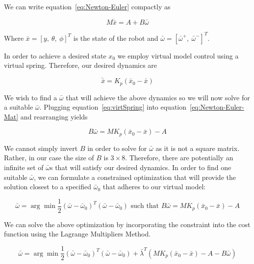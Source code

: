 \documentclass{article}
\begin{document}
We can write equation~\ref{eq:Newton-Euler} compactly as

\begin{equation}
	M \ddot{\bar{x}} = A + B \bar{\omega}
	\label{eq:Newton-Euler-Mat}
\end{equation}

Where $\bar{x} = [y, \ \theta, \ \phi]^T$ is the state of the robot and $\bar{\omega} = [\bar{\omega}^+, \ \bar{\omega}^-]^T$.

In order to achieve a desired state $x_0$ we employ virtual model control using a virtual spring. Therefore, our desired dynamics are

\begin{equation}
	\ddot{\bar{x}} = K_p (\bar{x}_0 - \bar{x})
	\label{eq:virtSpring}
\end{equation}

We wish to find a $\bar{\omega}$ that will achieve the above dynamics so we will now solve for a suitable $\bar{\omega}$. Plugging equation~\ref{eq:virtSpring} into equation~\ref{eq:Newton-Euler-Mat} and rearranging yields

\begin{equation}
	B \bar{\omega} = M K_p (\bar{x}_0 - \bar{x}) - A
\end{equation}

We cannot simply invert $B$ in order to solve for $\bar{\omega}$ as it is not a square matrix.  Rather, in our case the size of $B$ is $3 \times 8$. Therefore, there are potentially an infinite set of $\bar{\omega}$s that will satisfy our desired dynamics. In order to find one suitable $\bar{\omega}$, we can formulate a constrained optimization that will provide the solution closest to a specified $\bar{\omega}_0$ that adheres to our virtual model:

\begin{equation}
	\bar{\omega} = \arg \min \frac{1}{2} (\bar{\omega} - \bar{\omega}_0)^T (\bar{\omega} - \bar{\omega}_0) \textrm{~such that~} B \bar{\omega} = M K_p (\bar{x}_0 - \bar{x}) - A
\end{equation}

We can solve the above optimization by incorporating the constraint into the cost function using the Lagrange Multipliers Method.

\begin{equation}
	\bar{\omega} = \arg \min \frac{1}{2} (\bar{\omega} - \bar{\omega}_0)^T (\bar{\omega} - \bar{\omega}_0) + \bar{\lambda}^T  (M K_p (\bar{x}_0 - \bar{x}) - A - B \bar{\omega})
\end{equation}
\end{document}

